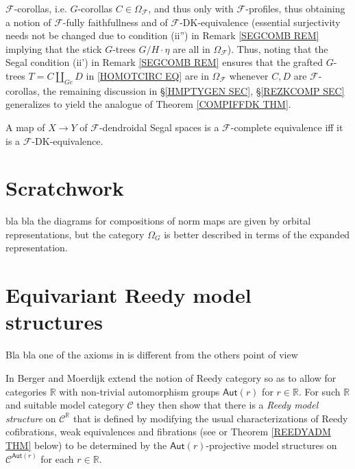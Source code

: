 \documentclass[a4paper,10pt
,draft
]{article}%
\begin{document}
$\mathcal{F}$-corollas, i.e. $G$-corollas
$C \in \Omega_{\mathcal{F}}$,
and thus only with $\mathcal{F}$-profiles, thus obtaining a notion of $\mathcal{F}$-fully faithfullness and of $\mathcal{F}$-DK-equivalence 
(essential surjectivity needs not be changed due to condition (ii'') in Remark \ref{SEGCOMB REM} implying that the stick $G$-trees $G/H \cdot \eta$ are all in $\Omega_{\mathcal{F}}$).
Thus, noting that the Segal condition (ii') in Remark \ref{SEGCOMB REM}
ensures that the grafted $G$-trees 
$T=C \amalg_{Ge} D$ in \eqref{HOMOTCIRC EQ}
are in $\Omega_{\mathcal{F}}$
whenever $C,D$ are $\mathcal{F}$-corollas,
the remaining discussion in 
\S \ref{HMPTYGEN SEC}, \S \ref{REZKCOMP SEC}
generalizes to yield the analogue of 
Theorem \ref{COMPIFFDK THM}.
\begin{theorem}\label{FCOMPIFFDK THM}
A map of $X \to Y$ of $\mathcal{F}$-dendroidal Segal spaces is a $\mathcal{F}$-complete equivalence iff it is a $\mathcal{F}$-DK-equivalence.
\end{theorem}




\section{Scratchwork}


\begin{remark}
{\color{blue} bla bla} the diagrams for compositions of norm maps are given by orbital representations, but the category $\Omega_G$ is better described in terms of the expanded representation.
\end{remark}





\newpage


\appendix

\section{Equivariant Reedy model structures}\label{EQREED AP}


{\color{blue} Bla bla one of the axioms in \cite{BM11} is different from the others point of view}

In \cite{BM11} Berger and Moerdijk extend the notion of Reedy category so as to allow for categories $\mathbb{R}$
 with non-trivial automorphism groups 
 $\mathsf{Aut}(r)$ for $r \in \mathbb{R}$.
For such $\mathbb{R}$ and suitable model category $\mathcal{C}$ they then show that there is a 
\textit{Reedy model structure}
on $\mathcal{C}^{\mathbb{R}}$
that is defined by modifying the usual characterizations of
Reedy cofibrations, weak equivalences and fibrations
(see \cite[Thm. 1.6]{BM11} or
Theorem \ref{REEDYADM THM} below)
 to be determined by the $\mathsf{Aut}(r)$-projective model structures
on $\mathcal{C}^{\mathsf{Aut}(r)}$
for each $r \in \mathbb{R}$. 
\end{document}
